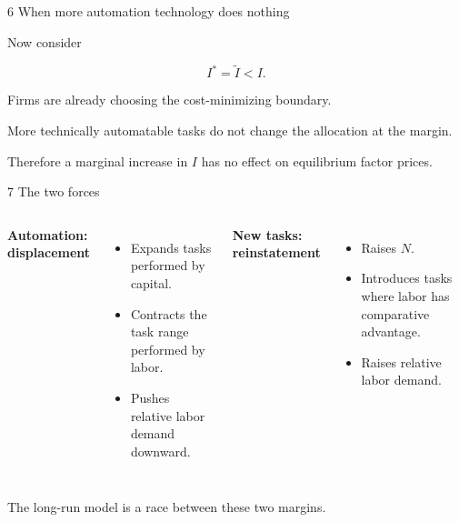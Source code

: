 \documentclass[aspectratio=169,11pt]{beamer}
\begin{document}

\begin{frame}{6 \textperiodcentered{} When more automation technology does nothing}

  Now consider

  \[
    I^*=\widetilde I<I.
  \]

  Firms are already choosing the cost-minimizing boundary.

  \medskip

  More technically automatable tasks do not change the allocation
  at the margin.

  \medskip

  Therefore a marginal increase in $I$ has no effect on
  equilibrium factor prices.

  \medskip

  \begin{center}
  \end{center}

\end{frame}


\begin{frame}{7 \textperiodcentered{} The two forces}

  \begin{columns}[T]


    \textbf{Automation: displacement}

    \begin{itemize}\small
      \item Expands tasks performed by capital.
      \item Contracts the task range performed by labor.
      \item Pushes relative labor demand downward.
    \end{itemize}


    \textbf{New tasks: reinstatement}

    \begin{itemize}\small
      \item Raises $N$.
      \item Introduces tasks where labor has comparative advantage.
      \item Raises relative labor demand.
    \end{itemize}

  \end{columns}

  \medskip

  \begin{center}
    The long-run model is a race between these two margins.
  \end{center}

\end{frame}
\end{document}
